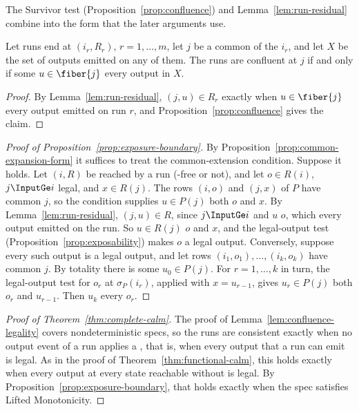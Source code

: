 The Survivor test (Proposition~\ref{prop:confluence}) and
Lemma~\ref{lem:run-residual} combine into the form that the later arguments
use.

\begin{lemma}[Reconciliation]
\label{lem:reconciliation}
Let runs end at $(i_r,R_r)$, $r=1,\ldots,m$, let $j$ be a common \indesc of
the $i_r$, and let $X$ be the set of outputs emitted on any of them.  The runs
are confluent at $j$ if and only if some $u\in\fiber{j}$ \outrel every output
in $X$.
\end{lemma}

\begin{proof}
By Lemma~\ref{lem:run-residual}, $(j,u)\in R_r$ exactly when $u\in\fiber{j}$
\outrel every output emitted on run $r$, and Proposition~\ref{prop:confluence}
gives the claim.
\end{proof}

\begin{proof}[Proof of Proposition~\ref{prop:exposure-boundary}]
By Proposition~\ref{prop:common-expansion-form} it suffices to treat the
common-extension condition.  Suppose it holds.  Let $(i,R)$ be reached by a run
(\commitment-free or not), and let $o\in R(i)$, $j\InputGe i$ legal, and
$x\in R(j)$.  The rows $(i,o)$ and $(j,x)$ of $P$ have common \indesc $j$, so
the condition supplies $u\in P(j)$ \outrelpart both $o$ and $x$.  By
Lemma~\ref{lem:run-residual}, $(j,u)\in R$, since $j\InputGe i$ and $u$
\outrel $o$, which \outrel every output emitted on the run.  So $u\in R(j)$
\outrel $o$ and $x$, and the legal-output test
(Proposition~\ref{prop:exposability}) makes $o$ a legal output.
Conversely, suppose every such output is a legal output, and let rows
$(i_1,o_1),\ldots,(i_k,o_k)$ have common \indesc $j$.  By totality there is some
$u_0\in P(j)$.  For $r=1,\ldots,k$ in turn, the legal-output test for $o_r$ at
$\sigma_P(i_r)$, applied with $x=u_{r-1}$, gives $u_r\in P(j)$ \outrelpart both
$o_r$ and $u_{r-1}$.  Then $u_k$ \outrel every $o_r$.
\end{proof}

\begin{proof}[Proof of Theorem~\ref{thm:complete-calm}]
The proof of Lemma~\ref{lem:confluence-legality} covers nondeterministic specs,
so the runs are consistent exactly when no output event of a run applies a
\commitment, that is, when every output that a run can emit is legal.  As in the proof of Theorem~\ref{thm:functional-calm}, this holds exactly
when every output at every state reachable without \commitment is legal.  By
Proposition~\ref{prop:exposure-boundary}, that holds exactly when the spec
satisfies Lifted Monotonicity.
\end{proof}

